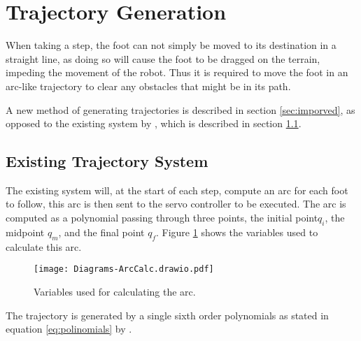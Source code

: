         \newpage
    \section{Trajectory Generation} \label{sec:arc_generation}
        When taking a step, the foot can not simply be moved to its destination in a straight line, as doing so will cause the foot to be dragged on the terrain, impeding the movement of the robot. Thus it is required to move the foot in an arc-like trajectory to clear any obstacles that might be in its path.

        A new method of generating trajectories is described in section \ref{sec:imporved}, as opposed to the existing system by \cite{erasmus2023guidance}, which is described in section \ref{sec:existing}.

        \subsection{Existing Trajectory System} \label{sec:existing}
            The existing system will, at the start of each step, compute an arc for each foot to follow, this arc is then sent to the servo controller
            to be executed. The arc is computed as a polynomial passing through three points, the initial point\(q_i\), the midpoint \(q_m\), and the final point \(q_f\).
            Figure \ref{fig:old_arc_vars} shows the variables used to calculate this arc.
            \begin{figure}[h]
                \centering
                \texttt{[image: Diagrams-ArcCalc.drawio.pdf]}
                \caption{Variables used for calculating the arc.}
                \label{fig:old_arc_vars}
            \end{figure}

            \noindent
            The trajectory is generated by a single sixth order polynomials as stated in equation \ref{eq:polinomials} by \cite{erasmus2023guidance}.

